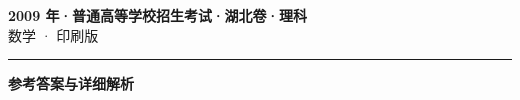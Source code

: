 \documentclass[zihao=5, a4paper]{ctexart}
\begin{document}
\begin{center}
  {\Large\bfseries 2009 年·普通高等学校招生考试·湖北卷·理科}\\[4pt]
  {\large 数学 · 印刷版}
\end{center}
\medskip
{}

\par\bigskip\hrule\bigskip
{}
\begin{center}{\large\bfseries 参考答案与详细解析}\end{center}
\smallskip

\end{document}
